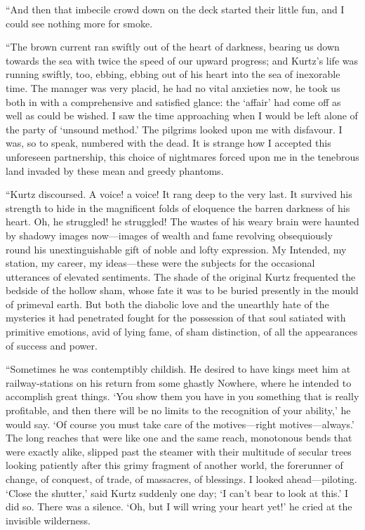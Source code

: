 \documentclass[12pt]{report}
\begin{document}
``And then that imbecile crowd down on the deck started their little
fun, and I could see nothing more for smoke.

``The brown current ran swiftly out of the heart of darkness, bearing us
down towards the sea with twice the speed of our upward progress; and
Kurtz's life was running swiftly, too, ebbing, ebbing out of his heart
into the sea of inexorable time. The manager was very placid, he had no
vital anxieties now, he took us both in with a comprehensive and
satisfied glance: the `affair' had come off as well as could be wished.
I saw the time approaching when I would be left alone of the party of
`unsound method.' The pilgrims looked upon me with disfavour. I was, so
to speak, numbered with the dead. It is strange how I accepted this
unforeseen partnership, this choice of nightmares forced upon me in the
tenebrous land invaded by these mean and greedy phantoms.

``Kurtz discoursed. A voice! a voice! It rang deep to the very last. It
survived his strength to hide in the magnificent folds of eloquence the
barren darkness of his heart. Oh, he struggled! he struggled! The wastes
of his weary brain were haunted by shadowy images now---images of wealth
and fame revolving obsequiously round his unextinguishable gift of noble
and lofty expression. My Intended, my station, my career, my
ideas---these were the subjects for the occasional utterances of
elevated sentiments. The shade of the original Kurtz frequented the
bedside of the hollow sham, whose fate it was to be buried presently in
the mould of primeval earth. But both the diabolic love and the
unearthly hate of the mysteries it had penetrated fought for the
possession of that soul satiated with primitive emotions, avid of lying
fame, of sham distinction, of all the appearances of success and power.

``Sometimes he was contemptibly childish. He desired to have kings meet
him at railway-stations on his return from some ghastly Nowhere, where
he intended to accomplish great things. `You show them you have in you
something that is really profitable, and then there will be no limits to
the recognition of your ability,' he would say. `Of course you must take
care of the motives---right motives---always.' The long reaches that
were like one and the same reach, monotonous bends that were exactly
alike, slipped past the steamer with their multitude of secular trees
looking patiently after this grimy fragment of another world, the
forerunner of change, of conquest, of trade, of massacres, of blessings.
I looked ahead---piloting. `Close the shutter,' said Kurtz suddenly one
day; `I can't bear to look at this.' I did so. There was a silence. `Oh,
but I will wring your heart yet!' he cried at the invisible wilderness.
\end{document}
